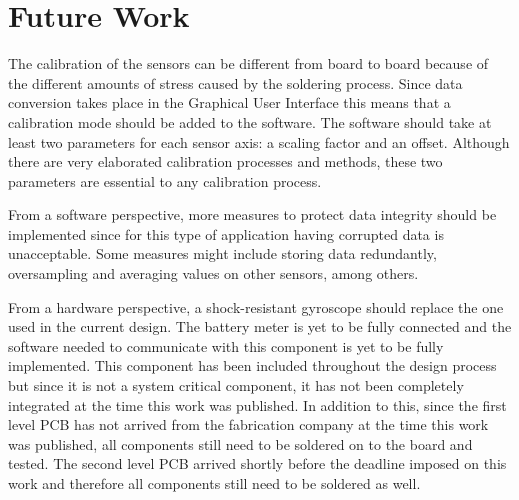 \section{Future Work}
\label{sec:futureWork}
The calibration of the sensors can be different from board to board because of the different amounts of stress caused by the soldering process.  Since data conversion takes place in the Graphical User Interface this means that a calibration mode should be added to the software.  The software should take at least two parameters for each sensor axis: a scaling factor and an offset.  Although there are very elaborated calibration processes and methods, these two parameters are essential to any calibration process. 

From a software perspective, more measures to protect data integrity should be implemented since for this type of application having corrupted data is unacceptable.  Some measures might include storing data redundantly, oversampling and averaging values on other sensors, among others.

From a hardware perspective, a shock-resistant gyroscope should replace the one used in the current design.  The battery meter is yet to be fully connected and the software needed to communicate with this component is yet to be fully implemented.  This component has been included throughout the design process but since it is not a system critical component, it has not been completely integrated at the time this work was published.  In addition to this, since the first level PCB has not arrived from the fabrication company at the time this work was published, all components still need to be soldered on to the board and tested.  The second level PCB arrived shortly before the deadline imposed on this work and therefore all components still need to be soldered as well.
